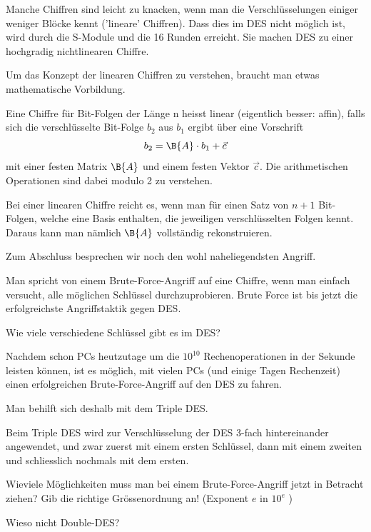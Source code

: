 \documentclass[%
11pt,%
twoside,%
titlepage,%
german,%
headsepline%
]{scrartcl}
\begin{document}
Manche Chiffren sind leicht zu knacken, wenn man die Verschlüsselungen einiger weniger Blöcke kennt ('lineare' Chiffren). 
Dass dies im DES nicht möglich ist, wird durch die S-Module und die 16 Runden erreicht. Sie machen DES zu einer hochgradig nichtlinearen Chiffre.

Um das Konzept der linearen Chiffren zu verstehen, braucht man etwas mathematische Vorbildung.

Eine Chiffre für Bit-Folgen der Länge n heisst linear (eigentlich besser: affin), falls sich die verschlüsselte Bit-Folge $b_2$ aus $b_1$ ergibt über eine Vorschrift
$$b_2 = \B{A} \cdot b_1 + \vec{c}$$
mit einer festen Matrix $\B{A}$ und einem festen Vektor $\vec{c}$. Die arithmetischen Operationen sind dabei modulo 2 zu verstehen.

Bei einer linearen Chiffre reicht es, wenn man für einen Satz von $n+1$ Bit-Folgen, welche eine Basis enthalten, die jeweiligen verschlüsselten Folgen kennt. Daraus kann man nämlich $\B{A}$ vollständig rekonstruieren.

Zum Abschluss besprechen wir noch den wohl naheliegendsten Angriff.

Man spricht von einem Brute-Force-Angriff auf eine Chiffre, wenn man einfach versucht, alle möglichen Schlüssel durchzuprobieren. 
Brute Force ist bis jetzt die erfolgreichste Angriffstaktik gegen DES.

\begin{ueb}
Wie viele verschiedene Schlüssel gibt es im DES?
\end{ueb}

Nachdem schon PCs heutzutage um die $10^{10}$ Rechenoperationen in der Sekunde leisten k\"onnen, ist es möglich, mit vielen PCs (und einige Tagen Rechenzeit) einen erfolgreichen Brute-Force-Angriff auf den DES zu fahren.

Man behilft sich deshalb mit dem Triple DES.

Beim Triple DES wird zur Verschlüsselung der DES 3-fach hintereinander angewendet, und zwar zuerst mit einem ersten Schlüssel, dann mit einem zweiten und schliesslich nochmals mit dem ersten.

\begin{ueb}
Wieviele Möglichkeiten muss man bei einem Brute-Force-Angriff jetzt in Betracht ziehen? 
Gib die richtige Gr\"ossenordnung an! (Exponent $e$ in $10^e$ )
\end{ueb}

\begin{ueb}
Wieso nicht Double-DES?
\end{ueb}
\end{document}
